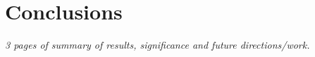 \chapter{Conclusions}\label{chap:Concl}
\textit{3 pages of summary of results, significance and future
directions/work.}
\vfill
\minitoc\newpage

